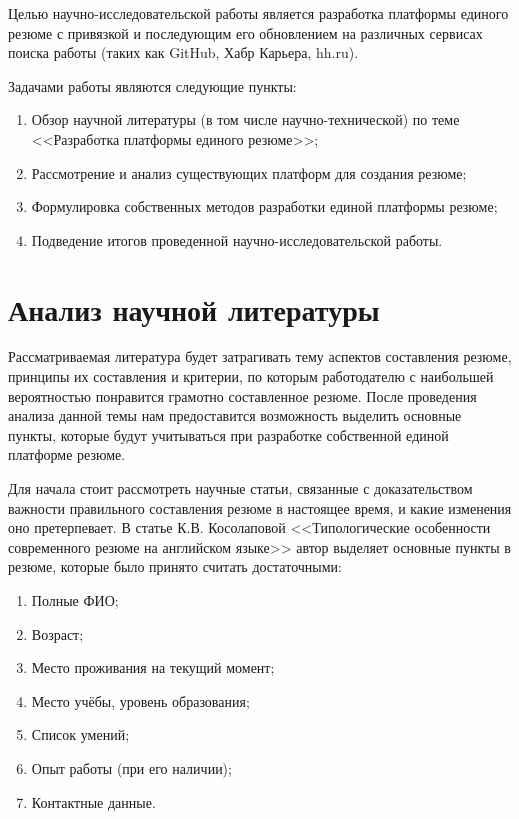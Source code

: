 \documentclass[master, och, pract]{SCWorks}
\begin{document}
Целью научно-исследовательской работы является разработка платформы единого 
резюме с привязкой и последующим его обновлением на различных сервисах 
поиска работы (таких как GitHub, Хабр Карьера, hh.ru).

Задачами работы являются следующие пункты:
\begin{enumerate}
    \item Обзор научной литературы (в том числе научно-технической) по теме 
    <<Разработка платформы единого резюме>>;
    \item Рассмотрение и анализ существующих платформ для создания резюме;
    \item Формулировка собственных методов разработки единой платформы резюме;
    \item Подведение итогов проведенной научно-исследовательской работы.
\end{enumerate}


\newpage
\section{Анализ научной литературы}
Рассматриваемая литература будет затрагивать тему аспектов составления резюме, 
принципы их составления и критерии, по которым работодателю с наибольшей вероятностью 
понравится грамотно составленное резюме. После проведения анализа данной темы нам 
предоставится возможность выделить основные пункты, которые будут учитываться 
при разработке собственной единой платформе резюме.

Для начала стоит рассмотреть научные статьи, связанные с доказательством важности 
правильного составления резюме в настоящее время, и какие изменения  оно претерпевает. 
В статье К.В. Косолаповой <<Типологические особенности современного резюме на английском 
языке>> автор выделяет основные пункты в резюме, которые было принято считать достаточными:
\begin{enumerate}
    \item Полные ФИО;
    \item Возраст;
    \item Место проживания на текущий момент;
    \item Место учёбы, уровень образования;
    \item Список умений;
    \item Опыт работы (при его наличии);
    \item Контактные данные.
\end{enumerate}
\end{document}
